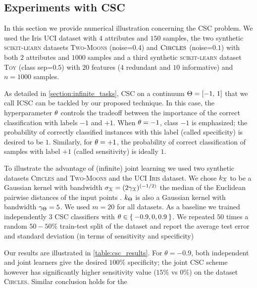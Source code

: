 \subsection{Experiments with \ac{CSC}}
\label{subsection:csc_expe}
In this section we provide numerical illustration concerning the \ac{CSC} problem.
We used the Iris \acs{UCI} dataset with $4$ attributes and $150$
samples, the two synthetic \textsc{scikit-learn}
\citep{pedregosa2011scikit} datasets \textsc{Two-Moons} (noise=$0.4$) and
$\textsc{Circles}$ (noise=$0.1$) with both $2$ attributes and $1000$
samples and a third synthetic \textsc{scikit-learn} dataset \textsc{Toy}
(class sep=$0.5$) with $20$ features ($4$ redundant and $10$ informative)
and $n=1000$ samples.\par
%
As detailed in \cref{section:infinite_tasks}, \acl{CSC} on a continuum
$\Theta = \left[-1,\,1\right]$ that we call \ac{ICSC}
can be tackled by our proposed technique.  In this case, the hyperparameter
$\theta$ controls the tradeoff between the importance of the correct
classification with labels $-1$ and $+1$. When $\theta = -1$,
class $-1$ is emphasized; the probability of correctly classified instances
with this label (called specificity) is desired to be $1$.  Similarly, for
$\theta = +1$, the probability of correct classification of samples
with label $+1$ (called sensitivity) is ideally $1$.\par
%
To illustrate the advantage of (infinite) joint learning we used two synthetic
datasets \textsc{Circles} and \textsc{Two-Moons} and the \acs{UCI}
\textsc{Iris} dataset. We chose $k_{\mathcal{X}}$ to be a Gaussian kernel with
bandwidth $\sigma_{\mathcal{X}}=(2\gamma_{\mathcal{X}})^{(-1/2)}$ the median of
the Euclidean pairwise distances of the input points \citep{jaakkola1999using}.
$k_{\Theta}$ is also a Gaussian kernel with bandwidth
$\gamma_{\Theta}=5$.  We used $m=20$ for all datasets.
%
As a baseline we trained independently 3 \acl{CSC} classifiers with
$\theta\in\Set{-0.9,0, 0.9}$. We repeated $50$ times a random $50-50\%$
train-test split of the dataset and report the average test error and standard
deviation (in terms of sensitivity and specificity) \par
%
Our results are illustrated in \cref{table:csc_results}. For $\theta=-0.9$, both
 independent and joint learners give the desired $100\%$ specificity; the
joint \acl{CSC} scheme however has significantly higher sensitivity value
($15\%$ vs $0\%$) on the dataset \textsc{Circles}. Similar conclusion holds for the
